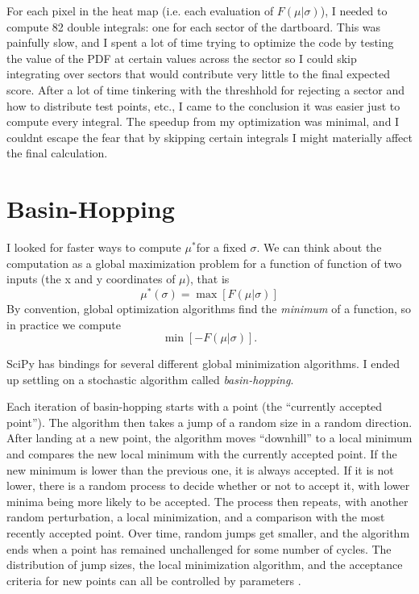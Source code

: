 \documentclass[]{article}
\newcommand{\mustar}{\ensuremath{\mu^* }}
\newcommand{\fmusig}{\ensuremath{F(\mu \vert \sigma)}}
\begin{document}
For each pixel in the heat map (i.e. each evaluation of \fmusig), I needed to compute 82 double integrals: one for each sector of the dartboard. This was painfully slow, and I spent a lot of time trying to optimize the code by testing the value of the PDF at certain values across the sector so I could skip integrating over sectors that would contribute very little to the final expected score. After a lot of time tinkering with the threshhold for rejecting a sector and how to distribute test points, etc., I came to the conclusion it was easier just to compute every integral. The speedup from my optimization was minimal, and I couldnt escape the fear that by skipping certain integrals I might materially affect the final calculation.


\section{Basin-Hopping}

I looked for faster ways to compute  \mustar for a fixed $\sigma$. We can think about the computation as a global maximization problem for a function of function of two inputs (the x and y coordinates of $\mu$), that is
\begin{equation}
	\mu^*(\sigma) = \max [F(\mu \vert \sigma)]
\end{equation}
By convention, global optimization algorithms find the \textit{minimum} of a function, so in practice we compute 
\begin{equation}
	\min[-F(\mu \vert \sigma)].
\end{equation}

SciPy has bindings for several different global minimization algorithms. I ended up settling on a stochastic algorithm called \textit{basin-hopping}. 

Each iteration of basin-hopping starts with a point (the ``currently accepted point''). The algorithm then takes a jump of a random size in a random direction. After landing at  a new point, the algorithm  moves ``downhill'' to a local minimum and compares the new local minimum with the currently accepted point. If the new minimum is lower than the previous one, it is always accepted. If it is not lower, there is a random process to decide whether or not to accept it, with lower minima being more likely to be accepted. The process then repeats, with another random perturbation, a local minimization, and a comparison with the most recently accepted point. Over time, random jumps get smaller, and the algorithm ends when a point has remained unchallenged for some number of cycles. The distribution of jump sizes, the local minimization algorithm, and the acceptance criteria for new points can all be controlled by parameters \cite{basin}. 
\end{document}
